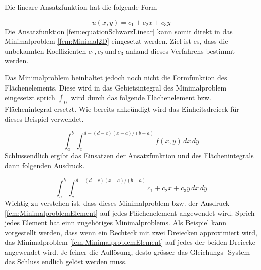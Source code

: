 



Die lineare Ansatzfunktion hat die folgende Form

\begin{equation}
u(x,y) = c_1 + c_2x + c_3y
\label{fem:equationSchwarzLinear}
\end{equation}
Die Ansatzfunktion \ref{fem:equationSchwarzLinear} kann somit direkt in das Minimalproblem \ref{fem:Minimal2D} eingesetzt werden. Ziel ist es, dass die unbekannten Koeffizienten $c_1, c_2 \, $und$ \, c_3$ anhand dieses Verfahrens bestimmt werden.

Das Minimalproblem beinhaltet jedoch noch nicht die Formfunktion des Flächenelements. Diese wird in das Gebietsintegral des Minimalproblem eingesetzt sprich $\int_{\Omega}$ wird durch das folgende Flächenelement bzw. Flächenintegral ersetzt. Wie bereits ankeündigt wird das Einheitsdreieck für dieses Beispiel verwendet.

\begin{equation}
\int_a^b \int_c^{d-(d-c)(x-a)/(b-a)} f(x,y) \, dx\,dy
\label{fem:FlaecheDreieck}
\end{equation}
Schlussendlich ergibt das Einsatzen der Ansatzfunktion und des Flächenintegrals dann folgenden Ausdruck.

\begin{equation}
\int_a^b \int_c^{d-(d-c)(x-a)/(b-a)} c_1 + c_2x + c_3y \, dx \, dy
\label{fem:MinimalproblemElement}
\end{equation}
Wichtig zu verstehen ist, dass dieses Minimalproblem bzw. der Ausdruck \ref{fem:MinimalproblemElement} auf jedes Flächenelement angewendet wird. Sprich jedes Element hat einn zugehöriges Minimalproblems. Als Beispiel kann vorgestellt werden, dass wenn ein Rechteck mit zwei Dreiecken approximiert wird, das Minimalproblem \ref{fem:MinimalproblemElement} auf jedes der beiden Dreiecke angewendet wird. Je feiner die Auflösung, desto grösser das Gleichungs- System das Schluss endlich gelöst werden muss.

